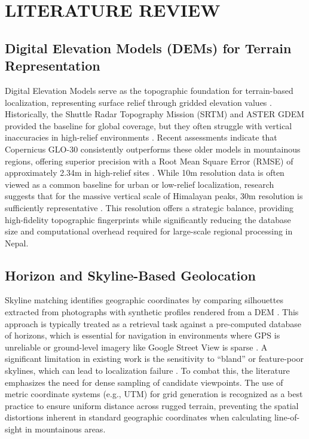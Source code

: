 \chapter{LITERATURE REVIEW}

\section{Digital Elevation Models (DEMs) for Terrain Representation}
Digital Elevation Models serve as the topographic foundation for terrain-based localization, representing surface relief through gridded elevation values \cite{purinton2017validation, okolie2024assessment}. Historically, the Shuttle Radar Topography Mission (SRTM) and ASTER GDEM provided the baseline for global coverage, but they often struggle with vertical inaccuracies in high-relief environments \cite{purinton2017validation}. Recent assessments indicate that Copernicus GLO-30 consistently outperforms these older models in mountainous regions, offering superior precision with a Root Mean Square Error (RMSE) of approximately 2.34m in high-relief sites \cite{okolie2024assessment}. While 10m resolution data is often viewed as a common baseline for urban or low-relief localization, research suggests that for the massive vertical scale of Himalayan peaks, 30m resolution is sufficiently representative \cite{purinton2017validation, okolie2024assessment}. This resolution offers a strategic balance, providing high-fidelity topographic fingerprints while significantly reducing the database size and computational overhead required for large-scale regional processing in Nepal.

\section{Horizon and Skyline-Based Geolocation}
Skyline matching identifies geographic coordinates by comparing silhouettes extracted from photographs with synthetic profiles rendered from a DEM \cite{baatz2012large, chen2015camera}. This approach is typically treated as a retrieval task against a pre-computed database of horizons, which is essential for navigation in environments where GPS is unreliable or ground-level imagery like Google Street View is sparse \cite{baatz2012large, rourera2022skyline}. A significant limitation in existing work is the sensitivity to ``bland'' or feature-poor skylines, which can lead to localization failure \cite{baatz2012large}. To combat this, the literature emphasizes the need for dense sampling of candidate viewpoints. The use of metric coordinate systems (e.g., UTM) for grid generation is recognized as a best practice to ensure uniform distance across rugged terrain, preventing the spatial distortions inherent in standard geographic coordinates when calculating line-of-sight in mountainous areas.

